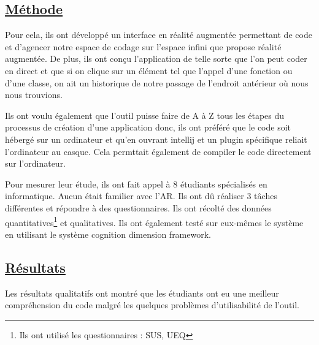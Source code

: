 \documentclass[a4paper,10pt, oneside]{article}
\newcommand{\li}{\newline}
\begin{document}
\subsection{\ul{Méthode}}   
        \par Pour cela, ils ont développé un interface en réalité augmentée permettant de code et d'agencer notre espace de codage sur l'espace infini que propose réalité augmentée. De plus,
        ils ont conçu l'application de telle sorte que l'on peut coder en direct et que si on clique sur un élément tel que l'appel d'une fonction ou d'une classe, on ait un historique de notre passage de l'endroit antérieur
        où nous nous trouvions. \li
        \par Ils ont voulu également que l'outil puisse faire de A à Z tous les étapes du processus de création d'une application donc, ils ont préféré que le code soit hébergé sur un ordinateur et qu'en ouvrant intellij et un plugin spécifique reliait l'ordinateur au casque. Cela permttait également de compiler
        le code directement sur l'ordinateur.\li
        \par Pour mesurer leur étude, ils ont fait appel à 8 étudiants spécialisés en informatique. Aucun était familier avec l'AR. Ils ont dû réaliser 3 tâches différentes et répondre à des questionnaires. Ils ont récolté des données quantitatives\footnote{Ils ont utilisé les questionnaires : SUS, UEQ} et qualitatives. Ils ont également 
        testé sur eux-mêmes le système en utilisant le système cognition dimension framework. 
\subsection{\ul{Résultats}}
        \par Les résultats qualitatifs ont montré que les étudiants ont eu une meilleur compréhension du code malgré les quelques problèmes d'utilisabilité de l'outil.


\end{document}
